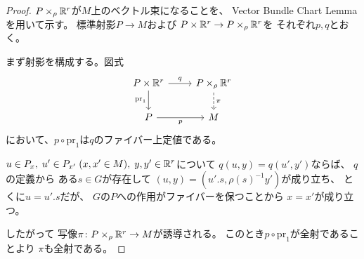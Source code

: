 \documentclass[report]{jlreq}
\begin{document}
\begin{proof}
    $P \times_\rho \mathbb{R}^r$が$M$上のベクトル束になることを、
    Vector Bundle Chart Lemma を用いて示す。
   標準射影$P \to M$および
    $P \times \mathbb{R}^r \to P \times_\rho \mathbb{R}^r$を
    それぞれ$p, q$とおく。

    まず射影を構成する。図式
    \begin{equation}
        \begin{tikzcd}
            P \times \R^r
                \ar{d}[swap]{\mathrm{pr}_1}
                \ar{r}{q}
                & P \times_\rho \R^r
                \ar[dashed]{d}{\pi} \\
            P \ar{r}[swap]{p}
                & M
        \end{tikzcd}
    \end{equation}
    において、$p \circ \mathrm{pr}_1$は$q$のファイバー上定値である。
    \begin{innerproof}
        $u \in P_x, \; u' \in P_{x'} \; (x, x' \in M),
        \; y, y' \in \mathbb{R}^r$について
        $q(u, y) = q(u', y')$ならば、
        $q$の定義から
        ある$s \in G$が存在して
        $(u, y) = (u' . s, \rho(s)^{-1} y')$が成り立ち、
        とくに$u = u' . s$だが、
        $G$の$P$への作用がファイバーを保つことから
        $x = x'$が成り立つ。
    \end{innerproof}
    したがって
    写像$\pi \colon P \times_\rho \mathbb{R}^r \to M$が誘導される。
    このとき$p \circ \mathrm{pr}_1$が全射であることより
    $\pi$も全射である。


\end{proof}
\end{document}
